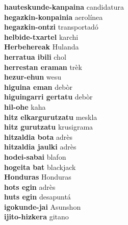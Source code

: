 \textbf{ hauteskunde-kanpaina  } candidatura \\
\textbf{ hegazkin-konpainia  } aerolínea \\
\textbf{ hegazkin-ontzi  } transportadó \\
\textbf{ helbide-txartel  } karchi \\
\textbf{ Herbehereak  } Hulanda \\
\textbf{ herratua ibili  } chol \\
\textbf{ herrestan eraman  } trèk \\
\textbf{ hezur-ehun  } wesu \\
\textbf{ higuina eman  } debòr \\
\textbf{ higuingarri gertatu  } debòr \\
\textbf{ hil-ohe  } kaha \\
\textbf{ hitz elkargurutzatu  } meskla \\
\textbf{ hitz gurutzatu  } krusigrama \\
\textbf{ hitzaldia bota  } adrès \\
\textbf{ hitzaldia jaulki  } adrès \\
\textbf{ hodei-sabai  } blafon \\
\textbf{ hogeita bat  } blackjack \\
\textbf{ Honduras  } Honduras \\
\textbf{ hots egin  } adrès \\
\textbf{ huts egin  } desapuntá \\
\textbf{ igokunde-jai  } Asunshon \\
\textbf{ ijito-hizkera  } gitano \\
